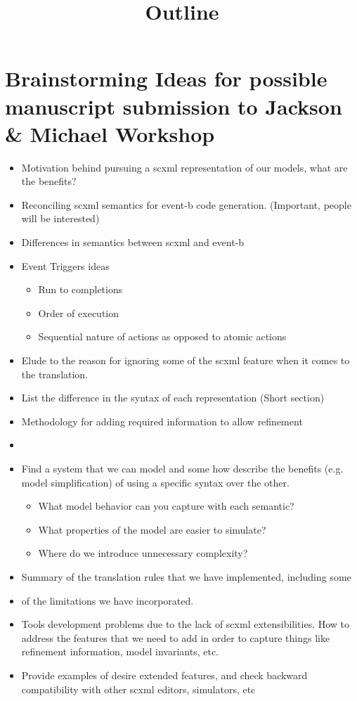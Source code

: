 \documentclass[12pt]{article}
\title{Outline}
\begin{document}
\maketitle

\section{Brainstorming Ideas for possible manuscript submission to Jackson \& Michael Workshop}

\begin{itemize}
\item Motivation behind pursuing a scxml representation of our models, what are the benefits? 
\item Reconciling scxml semantics for event-b code generation.  (Important, people will be interested)
\item Differences in semantics between scxml and event-b
\item Event Triggers ideas
	\begin{itemize}
		\item Run to completions 
		\item Order of execution
		\item Sequential nature of actions as opposed to atomic actions
	\end{itemize}	
\item Elude to the reason for ignoring some of the scxml feature when it comes to the translation.
\item List the difference in the syntax of each representation (Short section)
\item Methodology for adding required information to allow refinement
\item 
\item Find a system that we can model and some how describe the benefits (e.g. model simplification) of using a specific syntax over the other.
	\begin{itemize}
		\item What model behavior can you capture with each semantic?
		\item What properties of the model are easier to simulate?
		\item Where do we introduce unnecessary complexity?
	\end{itemize}	
\item Summary of the translation rules that we have implemented, including some
\item of the limitations we have incorporated.
\item Tools development problems due to the lack of scxml extensibilities. How to address the features that we need to add in order to capture things like refinement information, model invariants, etc.
\item Provide examples of desire extended features, and check backward compatibility with other scxml editors, simulators, etc
\end{itemize}
\end{document}
